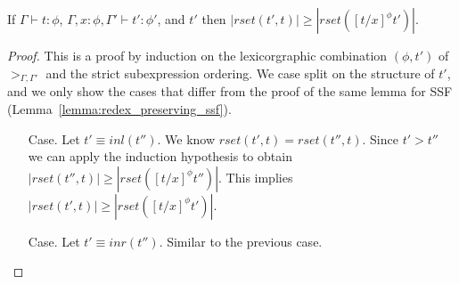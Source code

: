 \begin{lemma}
  \label{lemma:redex_preserving_ssfp}
  \small
  If $\Gamma \vdash t : \phi$, $\Gamma, x:\phi, \Gamma' \vdash t':\phi'$, and
  $t'$ then $|rset(t', t)| \geq |rset([t/x]^\phi t')|$.
\end{lemma}
\begin{proof}
  This is a proof by induction on the lexicorgraphic combination
  $(\phi, t')$ of $>_{\Gamma,\Gamma'}$ and the strict subexpression
  ordering.  We case split on the structure of $t'$, and we only show
  the cases that differ from the proof of the same lemma for SSF
  (Lemma~\ref{lemma:redex_preserving_ssf}).
\begin{itemize}  
  
\item[Case.] Let $t' \equiv inl(t'')$. We know $rset(t', t) = rset(t'', t)$.  Since $t' > t''$ we can apply
  the induction hypothesis to obtain $|rset(t'', t)| \geq |rset([t/x]^\phi t'')|$.  This implies
  $|rset(t', t)| \geq |rset([t/x]^\phi t')|$.
  
\item[Case.] Let $t' \equiv inr(t'')$. Similar to the previous case.  
  

\end{itemize}
\end{proof}
